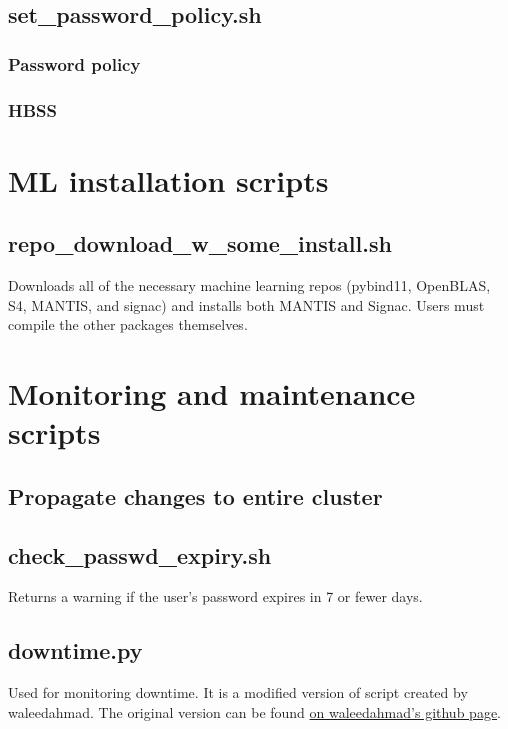 \documentclass[10pt,letterpaper]{report}
\begin{document}
\section{set\_password\_policy.sh} 	\label{sec:passwd}
\subsection{Password policy} 		\label{subsec:passwdpolicy}
	
\subsection{HBSS}					\label{subsec:HBSS}
	


\chapter{ML installation scripts}		\label{ch:install}

\section{repo\_download\_w\_some\_install.sh}	\label{sec:repoDL}
Downloads all of the necessary machine learning repos (pybind11, OpenBLAS, S4, MANTIS, and signac) and installs both MANTIS and Signac. Users must compile the other packages themselves.

	

\chapter{Monitoring and maintenance scripts}		\label{ch:monitor}

\section{Propagate changes to entire cluster} \label{sec:propagate}



\section{check\_passwd\_expiry.sh}	\label{sec:passwdExp}
Returns a warning if the user's password expires in 7 or fewer days.

\section{downtime.py}				\label{sec:downtime}
Used for monitoring downtime. It is a modified version of script created by waleedahmad. The original version can be found \href{https://gist.github.com/waleedahmad/326ec53f76646dccec299910a7fb4f2b}{on waleedahmad's github page}.
\end{document}
